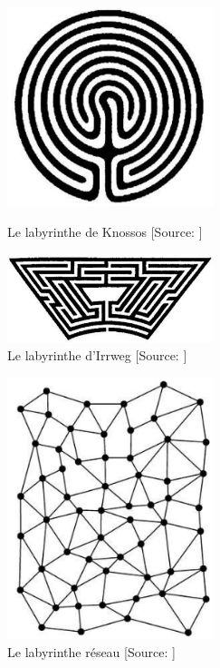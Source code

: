 \begin{figure}[!h]
	\centering
	\begin{minipage}[c]{.46\linewidth}
		\includegraphics[width=6cm]{images/laby_knossos.png}
		\caption[Le labyrinthe de Knossos]{Le labyrinthe de Knossos [Source: \cite[ch. 1.5]{eco_arbre_2010}]}
		\label{laby_knossos}
	\end{minipage}
	\begin{minipage}[c]{.46\linewidth}
		\includegraphics[width=6cm]{images/laby_irrweg.png}
		\caption[Le labyrinthe d'Irrweg]{Le labyrinthe d'Irrweg [Source: \cite[ch. 1.5]{eco_arbre_2010}]}
		\label{laby_irrweg}
\end{minipage}
\end{figure}

\begin{figure}[!h]
	\centering
		\includegraphics[width=6cm]{images/laby_reseau.png}
		\caption[Le labyrinthe réseau]{Le labyrinthe réseau [Source: \cite[ch. 1.5]{eco_arbre_2010}]}
		\label{laby_reseau}
\end{figure}